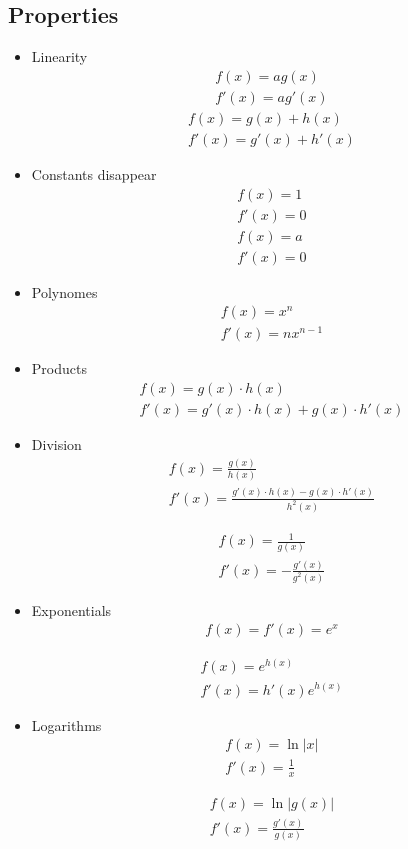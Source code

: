 \documentclass[a4paper] {scrartcl}%
\begin{document}
\subsection{Properties}
\begin{itemize}
	\item Linearity
	\begin{eqnarray*}
		f(x)=ag(x)\\
		f'(x)=ag'(x)
	\end{eqnarray*}
	\begin{eqnarray*}
		f(x)=g(x)+h(x)\\
		f'(x)=g'(x)+h'(x)
	\end{eqnarray*}
	\item Constants disappear
	\begin{eqnarray*}
		f(x)=1\\
		f'(x)=0
	\end{eqnarray*}
	\begin{eqnarray*}
		f(x)=a\\
		f'(x)=0
	\end{eqnarray*}
	
	\item Polynomes
	\begin{eqnarray*}
		f(x)=x^n\\
		f'(x)=nx^{n-1}
	\end{eqnarray*}
	
	\item Products
	\begin{eqnarray*}
		f(x)=g(x)\cdot h(x)\\
		f'(x)=g'(x)\cdot h(x)+g(x)\cdot h'(x)
	\end{eqnarray*}
	
	\item Division
	\begin{eqnarray*}
		f(x)=\frac{g(x)}{h(x)}\\
		f'(x)=\frac{g'(x)\cdot h(x)-g(x)\cdot h'(x)}{h^2(x)}
	\end{eqnarray*}
	
	\begin{eqnarray*}
		f(x)=\frac{1}{g(x)}\\
		f'(x)=-\frac{g'(x)}{g^2(x)}
	\end{eqnarray*}
	
	\item Exponentials
	\begin{eqnarray*}
		f(x)=f'(x)=e^{x}
	\end{eqnarray*}
	
	\begin{eqnarray*}
		f(x)=e^{h(x)}\\
		f'(x)=h'(x)e^{h(x)}
	\end{eqnarray*}
	
	\item Logarithms
	\begin{eqnarray*}
		f(x)=\ln|x|\\
		f'(x)=\frac{1}{x}
	\end{eqnarray*}
	
	\begin{eqnarray*}
		f(x)=\ln|g(x)|\\
		f'(x)=\frac{g'(x)}{g(x)}
	\end{eqnarray*}
\end{itemize}
\end{document}
